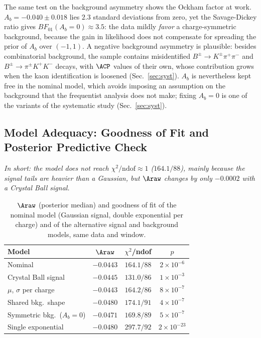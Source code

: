 The same test on the background asymmetry shows the Ockham factor at work. $A_b=-0.040\pm0.018$ lies $2.3$ standard deviations from zero, yet the Savage-Dickey ratio gives $BF_{01}(A_b=0)\approx3.5$: the data mildly \emph{favor} a charge-symmetric background, because the gain in likelihood does not compensate for spreading the prior of $A_b$ over $(-1,1)$. A negative background asymmetry is plausible: besides combinatorial background, the sample contains misidentified $B^\pm\to K^\pm\pi^+\pi^-$ and $B^\pm\to\pi^\pm K^+K^-$ decays, with $\ACP$ values of their own, whose contribution grows when the kaon identification is loosened (Sec.~\ref{sec:syst}). $A_b$ is nevertheless kept free in the nominal model, which avoids imposing an assumption on the background that the frequentist analysis does not make; fixing $A_b=0$ is one of the variants of the systematic study (Sec.~\ref{sec:syst}).



\subsection{Model Adequacy: Goodness of Fit and Posterior Predictive Check}
\label{sec:bayes_gof}
\emph{In short: the model does not reach $\chi^2/\mathrm{ndof}\approx1$ ($164.1/88$), mainly because the signal tails are heavier than a Gaussian, but $\Araw$ changes by only $-0.0002$ with a Crystal Ball signal.}
\begin{table}[!t]
\centering
\begin{tabular}{lccc}
\toprule
Model & $\Araw$ & $\chi^2$/ndof & $p$ \\
\midrule
Nominal & $-0.0443$ & $164.1/88$ & $2\times10^{-6}$ \\
Crystal Ball signal & $-0.0445$ & $131.0/86$ & $1\times10^{-3}$ \\
$\mu$, $\sigma$ per charge & $-0.0443$ & $164.2/86$ & $8\times10^{-7}$ \\
Shared bkg.\ shape & $-0.0480$ & $174.1/91$ & $4\times10^{-7}$ \\
Symmetric bkg.\ ($A_b=0$) & $-0.0471$ & $169.8/89$ & $5\times10^{-7}$ \\
Single exponential & $-0.0480$ & $297.7/92$ & $2\times10^{-23}$ \\
\bottomrule
\end{tabular}
\caption{$\Araw$ (posterior median) and goodness of fit of the nominal model (Gaussian signal, double exponential per charge) and of the alternative signal and background models, same data and window.}
\label{tab:gof}
\end{table}

